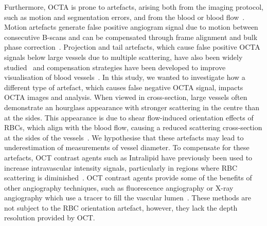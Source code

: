 \documentclass{optica-article}
\begin{document}
Furthermore, OCTA is prone to artefacts, arising both from the imaging protocol, such as motion and segmentation errors, and from the blood or blood flow~\cite{anvariArtifactsOpticalCoherence2021}. Motion artefacts generate false positive angiogram signal due to motion between consecutive B-scans and can be compensated through frame alignment and bulk phase correction~\cite{srinivasanRapidVolumetricAngiography2010,spaideImageArtifactsOptical2015}. Projection and tail artefacts, which cause false positive OCTA signals below large vessels due to multiple scattering, have also been widely studied~\cite{spaideImageArtifactsOptical2015,liBloodVesselTail2022} and compensation strategies have been developed to improve visualisation of blood vessels~\cite{zhangProjectionresolvedOpticalCoherence2016,zhouAdaptiveDynamicAnalysisbased2023,stefanDeepLearningToolbox2020}. In this study, we wanted to investigate how a different type of artefact, which causes false negative OCTA signal, impacts OCTA images and analysis. When viewed in cross-section, large vessels often demonstrate an hourglass appearance with stronger scattering in the centre than at the sides. This appearance is due to shear flow-induced orientation effects of RBCs, which align with the blood flow, causing a reduced scattering cross-section at the sides of the vessels~\cite{cimallaShearFlowinducedOptical2011}. We hypothesise that these artefacts may lead to underestimation of measurements of vessel diameter. To compensate for these artefacts, OCT contrast agents such as Intralipid have previously been used to increase intravascular intensity signals, particularly in regions where RBC scattering is diminished~\cite{panUltrasensitiveDetection3D2014,merkleDynamicContrastOptical2016,merkleLaminarMicrovascularTransit2016,zhuVisibilityMicrovesselsOptical2020,bernucciInvestigationArtifactsRetinal2018,tangNormalizedFieldAutocorrelation2019,glandorfBesselBeamOptical2024}. OCT contrast agents provide some of the benefits of other angiography techniques, such as fluorescence angiography or X-ray angiography which use a tracer to fill the vascular lumen~\cite{hammerLineScanningLaser2006,hammerAngiographyMultifunctionalLine2012,garroneQuantitativeCoronaryAngiography2009}. These methods are not subject to the RBC orientation artefact, however, they lack the depth resolution provided by OCT.
\end{document}
